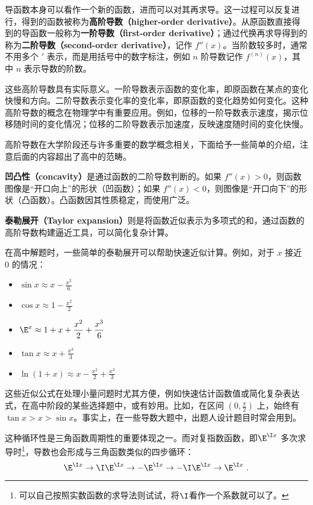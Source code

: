 导函数本身可以看作一个新的函数，进而可以对其再求导。这一过程可以反复进行，得到的函数被称为\textbf{高阶导数（higher-order derivative）}。从原函数直接得到的导函数一般称为\textbf{一阶导数（first-order derivative）}；通过代换再求导得到的称为\textbf{二阶导数（second-order derivative）}，记作 $f''(x)$。当阶数较多时，通常不用多个 $'$ 表示，而是用括号中的数字标注，例如 $n$ 阶导数记作 $f^{(n)}(x)$，其中 $n$ 表示导数的阶数。

这些高阶导数具有实际意义。一阶导数表示函数的变化率，即原函数在某点的变化快慢和方向。二阶导数表示变化率的变化率，即原函数的变化趋势如何变化。这种高阶导数的概念在物理学中有重要应用。例如，位移的一阶导数表示速度，揭示位移随时间的变化情况；位移的二阶导数表示加速度，反映速度随时间的变化快慢。

高阶导数在大学阶段还与许多重要的数学概念相关，下面给予一些简单的介绍，注意后面的内容超出了高中的范畴。

\textbf{凹凸性（concavity）}是通过函数的二阶导数判断的。如果 $f''(x) > 0$，则函数图像是“开口向上”的形状（凹函数）；如果 $f''(x) < 0$，则图像是“开口向下”的形状（凸函数）。凸函数因其性质稳定，而使用广泛。

\textbf{泰勒展开（Taylor expansion）}则是将函数近似表示为多项式的和，通过函数的高阶导数构建逼近工具，可以简化复杂计算。

在高中解题时，一些简单的泰勒展开可以帮助快速近似计算。例如，对于 $x$ 接近 $0$ 的情况：
\begin{itemize}
\item $\displaystyle\sin x \approx x - \frac{x^3}{6}$
\item $\displaystyle\cos x \approx 1 - \frac{x^2}{2}$
\item $\displaystyle \E^x \approx 1 + x + \frac{x^2}{2} + \frac{x^3}{6}$
\item $\displaystyle\tan x \approx x + \frac{x^3}{3}$
\item $\displaystyle\ln (1 + x) \approx x - \frac{x^2}{2} + \frac{x^3}{3}$
\end{itemize}

这些近似公式在处理小量问题时尤其方便，例如快速估计函数值或简化复杂表达式，在高中阶段的某些选择题中，或有妙用。比如，在区间 $(0, \frac{\pi}{2})$ 上，始终有 $\tan x > x > \sin x$。事实上，在一些导数大题中，出题人设计题目时常会用到。



这种循环性是三角函数周期性的重要体现之一。而对复指数函数，即$\E^{\I x}$ 多次求导时\footnote{可以自己按照实数函数的求导法则试试，将$\I$看作一个系数就可以了。}，导数也会形成与三角函数类似的四步循环：
\begin{equation}
\E^{\I x}\to\I\E^{\I x}\to-\E^{\I x}\to-\I\E^{\I x}\to\E^{\I x}~.
\end{equation}

